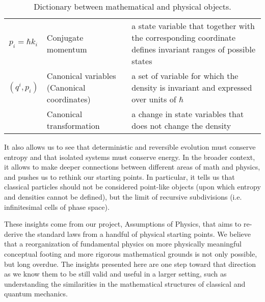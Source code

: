 \documentclass[11pt]{article}
\begin{document}
\begin{table}[h]
\begin{tabular}{c p{} p{} }
		$p_i=\hbar k_i$ & Conjugate momentum & a state variable that together with the corresponding coordinate defines invariant ranges of possible states \\
		$(q^i, p_i)$ & Canonical variables \newline (Canonical coordinates) & a set of variable for which the density is invariant and expressed over units of $\hbar$\\ 
		& Canonical transformation & a change in state variables that does not change the density\\ 
	\end{tabular}
	\caption{Dictionary between mathematical and physical objects.}
	\label{dictionary}
\end{table}
It also allows us to see that deterministic and reversible evolution must conserve entropy and that isolated systems must conserve energy. In the broader context, it allows to make deeper connections between different areas of math and physics, and pushes us to rethink our starting points. In particular, it tells us that classical particles should not be considered point-like objects (upon which entropy and densities cannot be defined), but the limit of recursive subdivisions (i.e. infinitesimal cells of phase space).

These insights come from our project, Assumptions of Physics, that aims to re-derive the standard laws from a handful of physical starting points. We believe that a reorganization of fundamental physics on more physically meaningful conceptual footing and more rigorous mathematical grounds is not only possible, but long overdue. The insights presented here are one step toward that direction as we know them to be still valid and useful in a larger setting, such as understanding the similarities in the mathematical structures of classical and quantum mechanics.
\end{document}
